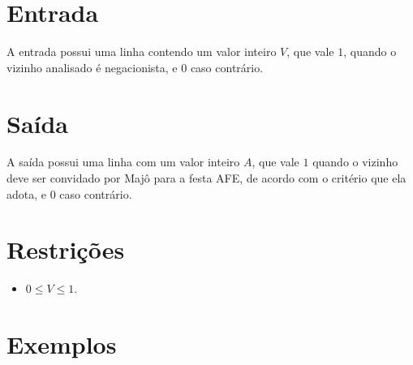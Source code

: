 \section*{Entrada}

A entrada possui uma linha contendo um valor inteiro $V$, que vale $1$, quando o vizinho analisado é negacionista, e $0$ caso contrário.

\section*{Saída}

A saída possui uma linha com um valor inteiro $A$, que vale $1$ quando o vizinho deve ser convidado por Majô para a festa AFE, de acordo com o critério que ela adota, e $0$ caso contrário.

\section*{Restrições}

\begin{itemize}
	\item $0 \leq V \leq 1$.
\end{itemize}


\section*{Exemplos}

\exemplo

